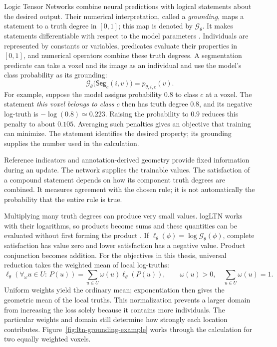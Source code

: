 \documentclass[12pt,a4paper]{article}
\begin{document}
Logic Tensor Networks combine neural predictions with logical statements
about the desired output. Their numerical interpretation, called a
\emph{grounding}, maps a statement to a truth degree in $[0,1]$; this map
is denoted by $\mathcal G_\theta$. It makes statements differentiable
with respect to the model parameters
\cite{badreddine2022logic}. Individuals are represented by constants or
variables, predicates evaluate their properties in $[0,1]$, and numerical
operators combine these truth degrees. A segmentation predicate can take
a voxel and its image as an individual and use the model's class
probability as its grounding:
\begin{equation}
\mathcal{G}_{\theta}\bigl(\mathsf{Seg}_c(i,v)\bigr)
=p_{\theta,i,c}(v).
\label{eq:segmentation-predicate}
\end{equation}
For example, suppose the model assigns probability $0.8$ to class $c$
at a voxel. The statement \emph{this voxel belongs to class $c$} then
has truth degree $0.8$, and its negative log-truth is
$-\log(0.8)\simeq0.223$. Raising the probability to $0.9$ reduces this
penalty to about $0.105$. Averaging such penalties gives an objective
that training can minimize. The statement identifies the desired
property; its grounding supplies the number used in the calculation.

Reference indicators and annotation-derived geometry provide fixed
information during an update. The network supplies the trainable values.
The satisfaction of a compound statement depends on how its component
truth degrees are combined. It measures agreement with the chosen rule;
it is not automatically the probability that the entire rule is true.

Multiplying many truth degrees can produce very small values.
logLTN works with their logarithms, so products become sums and these
quantities can be evaluated without first forming the product
\cite{badreddine2023logltn}. If
$\ell_\theta(\phi)=\log\mathcal G_\theta(\phi)$, complete satisfaction
has value zero and lower satisfaction has a negative value. Product
conjunction becomes addition. For the objectives in this thesis,
universal reduction takes the weighted mean of local log-truths:
\begin{equation}
\ell_{\theta}(\forall_{\omega}u\in U:\,P(u))
=\sum_{u\in U}\omega(u)\ell_{\theta}(P(u)),
\qquad
\omega(u)>0,\quad\sum_{u\in U}\omega(u)=1.
\label{eq:weighted-log-universal}
\end{equation}
Uniform weights yield the ordinary mean; exponentiation then gives the
geometric mean of the local truths. This normalization prevents a larger
domain from increasing the loss solely because it contains more
individuals. The particular weights and domain still determine how
strongly each location contributes.
Figure~\ref{fig:ltn-grounding-example} works through the calculation
for two equally weighted voxels.
\end{document}
